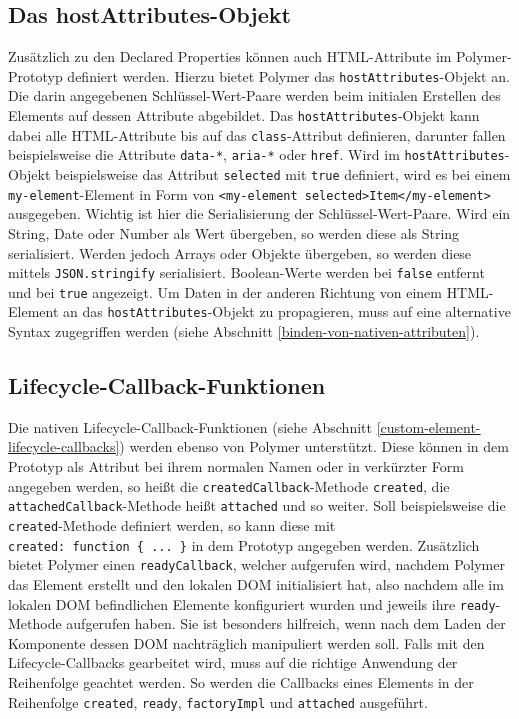 \subsection{Das hostAttributes-Objekt}\label{das-hostattributes-objekt}

Zusätzlich zu den Declared Properties können auch \ac{HTML}-Attribute im Polymer-Pro\-to\-typ definiert werden. Hierzu bietet Polymer das \texttt{hostAttributes}-Objekt an. Die darin angegebenen Schlüssel-Wert-Paare werden beim initialen Erstellen des Elements auf dessen Attribute abgebildet. Das \texttt{hostAttributes}-Objekt kann dabei alle \ac{HTML}-Attribute bis auf das \texttt{class}-Attribut definieren, darunter fallen beispielsweise die Attribute \mbox{\texttt{data-*}}, \texttt{aria-*} oder \texttt{href}. Wird im \texttt{hostAttributes}-Objekt beispielsweise das Attribut \texttt{selected} mit \texttt{true} definiert, wird es bei einem \texttt{my-element}-Element in Form von \texttt{\textless{}my-element\ selected\textgreater{}Item\textless{}/my-element\textgreater{}} ausgegeben. Wichtig ist hier die Serialisierung der Schlüssel-Wert-Paare. Wird ein String, Date oder Number als Wert übergeben, so werden diese als String serialisiert. Werden jedoch Arrays oder Objekte übergeben, so werden diese mittels \texttt{JSON.stringify} serialisiert. Boolean-Werte werden bei \texttt{false} entfernt und bei \texttt{true} angezeigt. Um Daten in der anderen Richtung von einem \ac{HTML}-Element an das \texttt{hostAttributes}-Objekt zu propagieren, muss auf eine alternative Syntax zugegriffen werden (siehe Abschnitt \ref{binden-von-nativen-attributen}).


\subsection{Lifecycle-Callback-Funktionen}\label{lifecycle-callback-funktionen}

Die nativen Lifecycle-Callback-Funktionen (siehe Abschnitt \ref{custom-element-lifecycle-callbacks}) werden ebenso von Polymer unterstützt. Diese können in dem Prototyp als Attribut bei ihrem normalen Namen oder in verkürzter Form angegeben werden, so heißt die \texttt{createdCallback}-Methode \texttt{created}, die \texttt{attachedCallback}-Methode heißt \texttt{attached} und so weiter. Soll beispielsweise die \texttt{created}-Methode definiert werden, so kann diese mit \texttt{created:\ function\ \{\ ...\ \}} in dem Prototyp angegeben werden. Zusätzlich bietet Polymer einen \texttt{readyCallback}, welcher aufgerufen wird, nachdem Polymer das Element erstellt und den lokalen \ac{DOM} initialisiert hat, also nachdem alle im lokalen \ac{DOM} befindlichen Elemente konfiguriert wurden und jeweils ihre \texttt{ready}-Methode aufgerufen haben. Sie ist besonders hilfreich, wenn nach dem Laden der Komponente dessen \ac{DOM} nachträglich manipuliert werden soll. Falls mit den Lifecycle-Callbacks gearbeitet wird, muss auf die richtige Anwendung der Reihenfolge geachtet werden. So werden die Callbacks eines Elements in der Reihenfolge \texttt{created}, \texttt{ready}, \texttt{factoryImpl} und \texttt{attached} ausgeführt.


